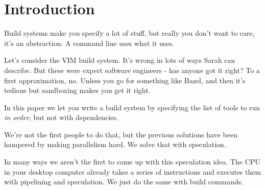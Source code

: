 \section{Introduction}

Build systems make you specify a lot of stuff, but really you don't want to care, it's an abstraction. A command line uses what it uses.

Let's consider the VIM build system. It's wrong in lots of ways Sarah can describe. But these were expert software engineers - has anyone got it right? To a first approximation, no. Unless you go for something like Bazel, and then it's tedious but sandboxing makes you get it right.

In this paper we let you write a build system by specifying the list of tools to run \emph{in order}, but not with dependencies.

We're not the first people to do that, but the previous solutions have been hampered by making parallelism hard. We solve that with speculation.

In many ways we aren't the first to come up with this speculation idea. The CPU in your desktop computer already takes a series of instructions and executes them with pipelining and speculation. We just do the same with build commands.
